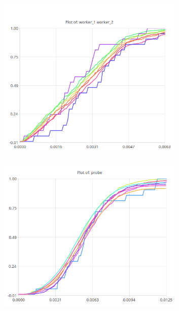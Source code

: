 \begin{figure}[H]
            \centering
            \begin{subfigure}{.5\textwidth}
                \centering
                \includegraphics[width=0.98\textwidth]{img/superp21.png}
                \label{fig:sp21}
            \end{subfigure}%
            \begin{subfigure}{.5\textwidth}
                \centering
                \includegraphics[width =0.98\textwidth]{img/superp22.png}
                \label{fig:sub2}
            \end{subfigure}
            \label{fig:sp22}
            \end{figure}

